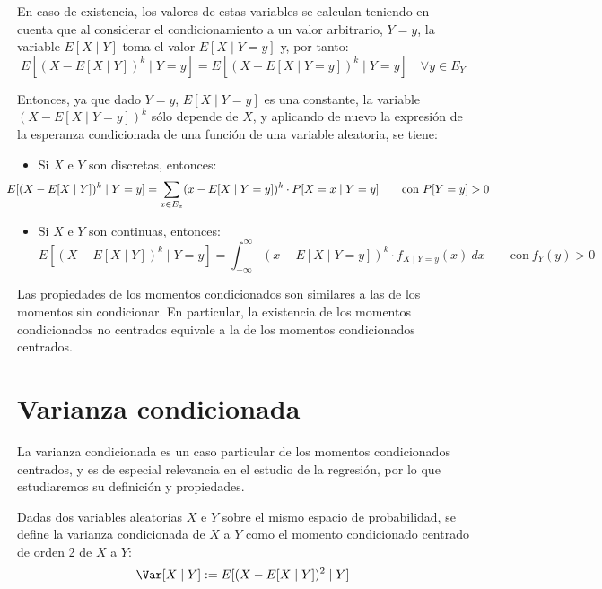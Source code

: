 En caso de existencia, los valores de estas variables se calculan teniendo en cuenta que al considerar el condicionamiento a un valor arbitrario, $Y = y$, la variable $E[X\mid Y]$ toma el valor $E[X\mid Y = y]$ y, por tanto:
\begin{equation*}
    E[(X - E[X\mid Y])^k\mid Y = y] = E[(X - E[X\mid Y = y])^k\mid Y = y] \quad \forall y\in E_Y
\end{equation*}

Entonces, ya que dado $Y = y$, $E[X\mid Y = y]$ es una constante, la variable $(X - E[X\mid Y = y])^k$ sólo depende de $X$, y aplicando de nuevo la expresión de la esperanza condicionada de una función de una variable aleatoria, se tiene:
\begin{itemize}
    \item Si $X$ e $Y$ son discretas, entonces:
    \begin{equation*}
        \hspace{-1cm}E[(X - E[X\mid Y])^k\mid Y = y] = \sum_{x\in E_x} (x - E[X\mid Y = y])^k\cdot P[X = x\mid Y = y] \qquad \text{con}~P[Y=y]>0
    \end{equation*}
    \item Si $X$ e $Y$ son continuas, entonces:
    \begin{equation*}
        E[(X - E[X\mid Y])^k\mid Y = y] = \int_{-\infty}^{\infty} (x - E[X\mid Y = y])^k\cdot f_{X\mid Y=y}(x)~dx \qquad \text{con}~f_Y(y)>0
    \end{equation*}
\end{itemize}

Las propiedades de los momentos condicionados son similares a las de los momentos sin condicionar. En particular,
la existencia de los momentos condicionados no centrados equivale a la de los momentos condicionados centrados.

\section{Varianza condicionada}

La varianza condicionada es un caso particular de los momentos condicionados centrados, y es de especial relevancia en el estudio de la regresión, por lo que estudiaremos su definición y propiedades.
\begin{definicion}
    Dadas dos variables aleatorias $X$ e $Y$ sobre el mismo espacio de probabilidad, se define la varianza condicionada de $X$ a $Y$ como el momento condicionado centrado de orden 2 de $X$ a $Y$:
    \begin{equation*}
        \Var[X\mid Y] := E[(X - E[X\mid Y])^2\mid Y]
    \end{equation*}
\end{definicion}

